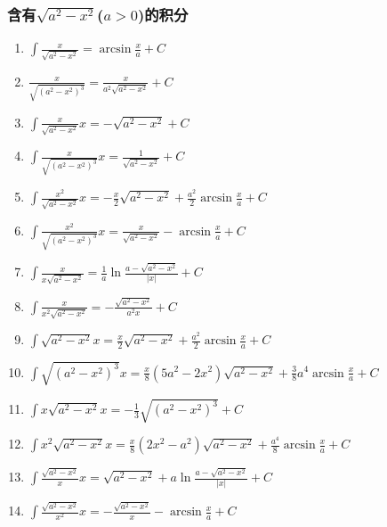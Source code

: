 \documentclass{book}
\begin{document}
\subsubsection{含有$\sqrt{a^2-x^2}$($a>0$)的积分}

\begin{enumerate}

\item $ \int \frac{ x}{\sqrt{a^2-x^2}} = \arcsin \frac{x}{a} + C $

\item $ \frac{ x}{\sqrt{(a^2-x^2)^3}} = \frac{x}{a^2\sqrt{a^2-x^2}} + C $

\item $ \int \frac{x}{\sqrt{a^2-x^2}}  x = -\sqrt{a^2-x^2} + C $

\item $ \int \frac{x}{\sqrt{(a^2-x^2)^3}}  x = \frac{1}{\sqrt{a^2-x^2}} + C $

\item $ \int \frac{x^2}{\sqrt{a^2-x^2}}  x = -\frac{x}{2}\sqrt{a^2-x^2} + \frac{a^2}{2}\arcsin\frac{x}{a} + C $

\item $ \int \frac{x^2}{\sqrt{(a^2-x^2)^3}}  x = \frac{x}{\sqrt{a^2-x^2}} - \arcsin\frac{x}{a} + C $

\item $ \int \frac{ x}{x\sqrt{a^2-x^2}} = \frac{1}{a}\ln\frac{a-\sqrt{a^2-x^2}}{|x|} + C$

\item $ \int \frac{ x}{x^2\sqrt{a^2-x^2}} = -\frac{\sqrt{a^2-x^2}}{a^2x} + C $

\item $ \int \sqrt{a^2-x^2} x = \frac{x}{2}\sqrt{a^2-x^2} + \frac{a^2}{2}\arcsin\frac{x}{a} + C $

\item $ \int \sqrt{(a^2-x^2)^3} x = \frac{x}{8}(5a^2-2x^2)\sqrt{a^2-x^2}+\frac{3}{8}a^4\arcsin\frac{x}{a} + C $

\item $ \int x\sqrt{a^2-x^2} x = -\frac{1}{3}\sqrt{(a^2-x^2)^3} + C $

\item $ \int x^2\sqrt{a^2-x^2} x = \frac{x}{8}(2x^2-a^2)\sqrt{a^2-x^2}+\frac{a^4}{8}\arcsin\frac{x}{a} + C $

\item $ \int \frac{\sqrt{a^2-x^2}}{x} x = \sqrt{a^2-x^2} + a \ln \frac{a-\sqrt{a^2-x^2}}{|x|} + C $

\item $ \int \frac{\sqrt{a^2-x^2}}{x^2}  x = -\frac{\sqrt{a^2-x^2}}{x} - \arcsin\frac{x}{a} + C $

\end{enumerate}
\end{document}
